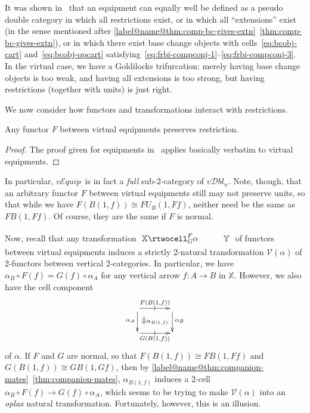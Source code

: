 \documentclass{tac}
\makeatletter
\newcommand{\calV}{\ensuremath{\mathcal{V}}}
\newcommand{\iso}{\cong}
\newcommand{\maps}{\colon}
\newcommand{\vEquip}{\ensuremath{\mathit{v}\mathcal{E}\!\mathit{quip}}}
\newcommand{\vDbln}{\ensuremath{\mathit{v}\mathcal{D}\mathit{bl}_{n}}}
\numberwithin{equation}{section}
\def\currthmtype{}
\def\autoref#1{\ref*{label@name@#1}~\ref{#1}}
\def\autoref#1{\ref{label@name@#1}~\ref{#1}}
\let\old@label\label
\def\label#1{%
    {\let\your@currentlabel\@currentlabel%
      \edef\@currentlabel{\currthmtype}%
      \old@label{label@name@#1}}%
    \old@label{#1}}
\makeatother
\begin{document}
\begin{remark}
  It was shown in~\cite{FramedBicats} that an equipment can equally
  well be defined as a pseudo double category in which all
  restrictions exist, or in which all ``extensions'' exist (in the sense
  mentioned after \autoref{thm:comp-bc-gives-extn}), or in which
  there exist base change objects with cells~\eqref{eq:bcobj-cart}
  and~\eqref{eq:bcobj-opcart}
  satisfying~\eqref{eq:frbi-compconj-1}--\eqref{eq:frbi-compconj-3}.
  In the virtual case, we have a
  Goldilocks trifurcation: merely having base change objects is too
  weak, and having all extensions is too strong, but having
  restrictions (together with units) is just right.
\end{remark}

We now consider how functors and transformations interact with
restrictions.

\begin{theorem}\label{thm:func-pres-restr}
  Any functor $F$ between virtual equipments preserves restriction.
\end{theorem}
\begin{proof}
  The proof given for equipments in~\cite[Theorem 6.4]{FramedBicats}
  applies basically verbatim to virtual equipments.
\end{proof}

In particular, \vEquip\ is in fact a \emph{full} sub-2-category of \vDbln.
Note, though, that an arbitrary functor $F$ between virtual equipments
still may not preserve units, so that while we
have $F(B(1,f)) \iso FU_B(1,Ff)$, neither need be the same as
$FB(1,Ff)$.  Of course, they are the same if $F$ is normal.

Now, recall that any transformation $\xymatrix{\mathbb{X} \rtwocell^F_G{\alpha}&\mathbb{Y}}$
of functors between virtual equipments induces a
strictly 2-natural transformation $\calV(\alpha)$ of 2-functors
between vertical 2-categories.  In particular, we have $\alpha_B \circ
F(f) = G(f) \circ \alpha_A$ for any vertical arrow $f\maps A\to B$ in
$\mathbb{X}$.  However, we also have the cell component
\[\vcenter{\xymatrix@C=3pc{ \ar[r]|-@{|}^-{F(B(1,f))} \ar[d]_{\alpha_A}
    \ar@{}[dr]|{{\textstyle\Downarrow}\alpha_{B(1,f)}} &  \ar[d]^{\alpha_B}\\
    \ar[r]|-@{|}_-{G(B(1,f))} & }}
\]
of $\alpha$.  If $F$ and $G$ are normal, so that $F(B(1,f))\iso
FB(1,{Ff})$ and $G(B(1,f))\iso GB(1,{Gf})$, then by
\autoref{thm:companion-mates}, $\alpha_{B(1,f)}$ induces a 2-cell $\alpha_B
\circ F(f) \to G(f) \circ \alpha_A$, which seems to be trying to make
$\calV(\alpha)$ into an \emph{oplax} natural transformation.
Fortunately, however, this is an illusion.
\end{document}
